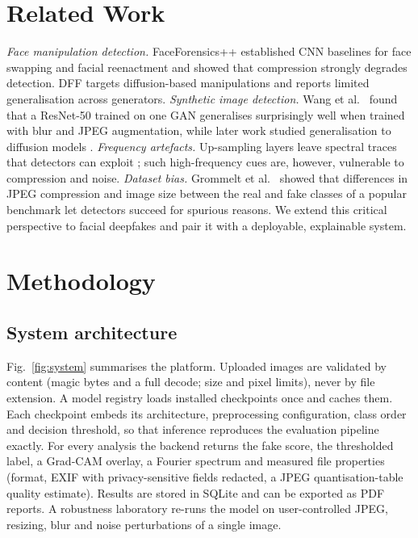 \documentclass[conference]{IEEEtran}
\begin{document}
\section{Related Work}
\textit{Face manipulation detection.} FaceForensics++ \cite{rossler2019ff} established CNN baselines for face swapping and facial reenactment and showed that compression strongly degrades detection. DFF \cite{song2023dff} targets diffusion-based manipulations and reports limited generalisation across generators. \textit{Synthetic image detection.} Wang et al.\ \cite{wang2020cnn} found that a ResNet-50 trained on one GAN generalises surprisingly well when trained with blur and JPEG augmentation, while later work studied generalisation to diffusion models \cite{ojha2023universal,corvi2023diffusion}. \textit{Frequency artefacts.} Up-sampling layers leave spectral traces that detectors can exploit \cite{durall2020upconv,frank2020frequency}; such high-frequency cues are, however, vulnerable to compression and noise. \textit{Dataset bias.} Grommelt et al.\ \cite{grommelt2024fake} showed that differences in JPEG compression and image size between the real and fake classes of a popular benchmark let detectors succeed for spurious reasons. We extend this critical perspective to facial deepfakes and pair it with a deployable, explainable system.

\section{Methodology}

\subsection{System architecture}
Fig.~\ref{fig:system} summarises the platform. Uploaded images are validated by content (magic bytes and a full decode; size and pixel limits), never by file extension. A model registry loads installed checkpoints once and caches them. Each checkpoint embeds its architecture, preprocessing configuration, class order and decision threshold, so that inference reproduces the evaluation pipeline exactly. For every analysis the backend returns the fake score, the thresholded label, a Grad-CAM overlay, a Fourier spectrum and measured file properties (format, EXIF with privacy-sensitive fields redacted, a JPEG quantisation-table quality estimate). Results are stored in SQLite and can be exported as PDF reports. A robustness laboratory re-runs the model on user-controlled JPEG, resizing, blur and noise perturbations of a single image.
\end{document}
